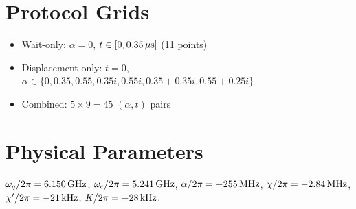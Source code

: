 \documentclass[11pt,onecolumn]{article}
\begin{document}
\section{Protocol Grids}
\begin{itemize}
\item Wait-only: $\alpha=0$, $t\in[0, 0.35\,\mu{\rm s}]$ (11 points)
\item Displacement-only: $t=0$, $\alpha\in\{0, 0.35, 0.55, 0.35i, 0.55i, 0.35{+}0.35i, 0.55{+}0.25i\}$
\item Combined: $5\times9=45$ $(\alpha,t)$ pairs
\end{itemize}

\section{Physical Parameters}
$\omega_q/2\pi=6.150\,{\rm GHz}$, $\omega_c/2\pi=5.241\,{\rm GHz}$,
$\alpha/2\pi=-255\,{\rm MHz}$, $\chi/2\pi=-2.84\,{\rm MHz}$,
$\chi'/2\pi=-21\,{\rm kHz}$, $K/2\pi=-28\,{\rm kHz}$.
\end{document}
